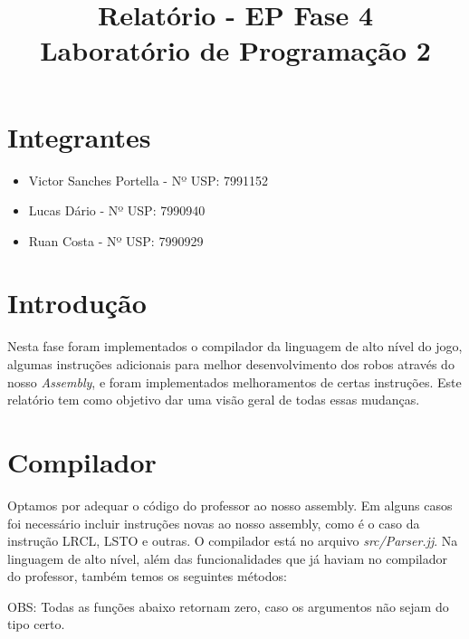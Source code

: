 \documentclass[11pt]{article}
\title{Relatório - EP Fase 4 \\ Laboratório de Programação 2}
\begin{document}
\maketitle

\section{Integrantes}

\begin{itemize}

\item Victor Sanches Portella - Nº USP: 7991152

\item Lucas Dário - Nº USP: 7990940

\item Ruan Costa - Nº USP: 7990929

\end{itemize}

\section{Introdução}

Nesta fase foram implementados o compilador da linguagem de alto nível do jogo, algumas instruções adicionais para melhor desenvolvimento dos robos através do nosso \emph{Assembly}, e foram implementados melhoramentos de certas instruções. Este relatório tem como objetivo dar uma visão geral de todas essas mudanças.

\section{Compilador}

Optamos por adequar o código do professor ao nosso assembly. Em alguns casos foi necessário incluir instruções novas ao nosso assembly, como é o caso da instrução LRCL, LSTO e outras. O compilador está no arquivo \emph{src/Parser.jj}.
Na linguagem de alto nível, além das funcionalidades que já haviam no compilador do professor, também temos os seguintes métodos:

OBS: Todas as funções abaixo retornam zero, caso os argumentos não sejam do tipo certo.
\end{document}
